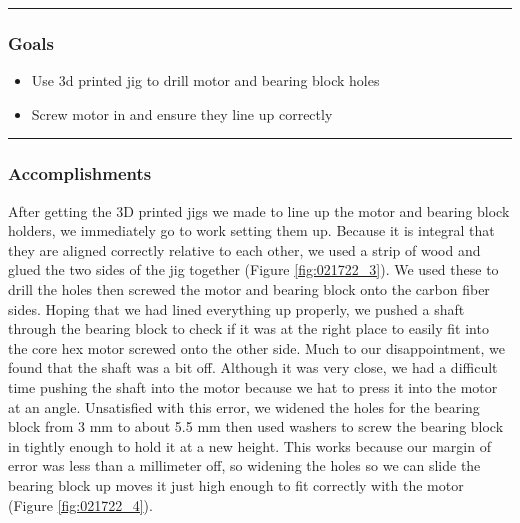 \noindent\hfil\rule{\textwidth}{.4pt}\hfil
\subsubsection*{Goals}
\begin{itemize}
    \item Use 3d printed jig to drill motor and bearing block holes
	\item Screw motor in and ensure they line up correctly


\end{itemize} 

\noindent\hfil\rule{\textwidth}{.4pt}\hfil

\subsubsection*{Accomplishments}
After getting the 3D printed jigs we made to line up the motor and bearing block holders, we immediately go to work setting them up. Because it is integral that they are aligned correctly relative to each other, we used a strip of wood and glued the two sides of the jig together (Figure \ref{fig:021722_3}). We used these to drill the holes then screwed the motor and bearing block onto the carbon fiber sides. Hoping that we had lined everything up properly, we pushed a shaft through the bearing block to check if it was at the right place to easily fit into the core hex motor screwed onto the other side. Much to our disappointment, we found that the shaft was a bit off. Although it was very close, we had a difficult time pushing the shaft into the motor because we hat to press it into the motor at an angle. Unsatisfied with this error, we widened the holes for the bearing block  from 3 mm to about 5.5 mm then used washers to screw the bearing block in tightly enough to hold it at a new height. This works because our margin of error was less than a millimeter off, so widening the holes so we can slide the bearing block up moves it just high enough to fit correctly with the motor (Figure \ref{fig:021722_4}). 



